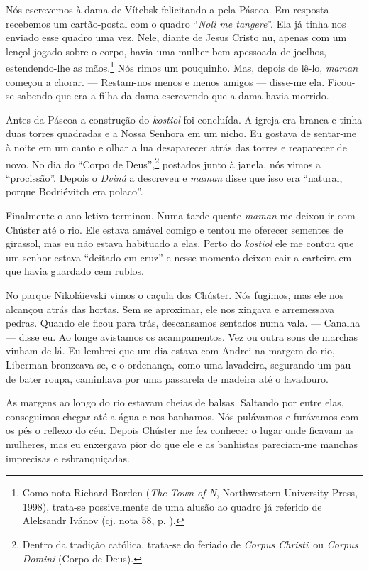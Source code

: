 Nós escrevemos à dama de Vítebsk felicitando-a pela Páscoa. Em resposta
recebemos um cartão-postal com o quadro ``\emph{Noli me tangere}''. Ela
já tinha nos enviado esse quadro uma vez. Nele, diante de Jesus Cristo
nu, apenas com um lençol jogado sobre o corpo, havia uma mulher
bem-apessoada de joelhos, estendendo-lhe as mãos.\footnote{Como nota
  Richard Borden (\emph{The Town of N}, Northwestern University Press,
  1998), trata-se possivelmente de uma alusão ao quadro já referido de
  Aleksandr Ivánov (cj. nota 58, p. ).} Nós rimos um pouquinho. Mas,
depois de lê-lo, \emph{maman} começou a chorar. --- Restam-nos menos e
menos amigos --- disse-me ela. Ficou-se sabendo que era a filha da dama
escrevendo que a dama havia morrido.

Antes da Páscoa a construção do \emph{kostiol} foi concluída. A igreja
era branca e tinha duas torres quadradas e a Nossa Senhora em um nicho.
Eu gostava de sentar-me à noite em um canto e olhar a lua desaparecer
atrás das torres e reaparecer de novo. No dia do ``Corpo de
Deus'',\footnote{Dentro da tradição católica, trata-se do feriado de
  \emph{Corpus Christi}~ou \emph{Corpus Domini} (Corpo de Deus).}
postados junto à janela, nós vimos a ``procissão''. Depois o
\emph{Dviná} a descreveu e \emph{maman} disse que isso era ``natural,
porque Bodriévitch era polaco''.

Finalmente o ano letivo terminou. Numa tarde quente \emph{maman} me
deixou ir com Chúster até o rio. Ele estava amável comigo e tentou me
oferecer sementes de girassol, mas eu não estava habituado a elas. Perto
do \emph{kostiol} ele me contou que um senhor estava ``deitado em cruz''
e nesse momento deixou cair a carteira em que havia guardado cem rublos.

No parque Nikoláievski vimos o caçula dos Chúster. Nós fugimos, mas ele
nos alcançou atrás das hortas. Sem se aproximar, ele nos xingava e
arremessava pedras. Quando ele ficou para trás, descansamos sentados
numa vala. --- Canalha --- disse eu. Ao longe avistamos os acampamentos.
Vez ou outra sons de marchas vinham de lá. Eu lembrei que um dia estava
com Andrei na margem do rio, Liberman bronzeava-se, e o ordenança, como
uma lavadeira, segurando um pau de bater roupa, caminhava por uma
passarela de madeira até o lavadouro.

As margens ao longo do rio estavam cheias de balsas. Saltando por entre
elas, conseguimos chegar até a água e nos banhamos. Nós pulávamos e
furávamos com os pés o reflexo do céu. Depois Chúster me fez conhecer o
lugar onde ficavam as mulheres, mas eu enxergava pior do que ele e as
banhistas pareciam-me manchas imprecisas e esbranquiçadas.

